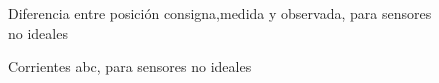 \documentclass[a4paper, 10pt, onecolumn,journal]{ieeeconf}
\begin{document}
\begin{figure}[H]
	\centering
	\begin{adjustbox}{max width=\columnwidth}
	\end{adjustbox}
	\caption{Diferencia entre posición consigna,medida y observada, para sensores no ideales}
	\label{Diferencia entre posición consigna,medida y observada, para sensores no ideales}
\end{figure}

\begin{figure}[H]
	\centering
	\begin{adjustbox}{max width=\columnwidth}
	\end{adjustbox}
	\caption{Corrientes abc, para sensores no ideales}
	\label{Corrientes abc, para sensores no ideales}
\end{figure}
\end{document}
